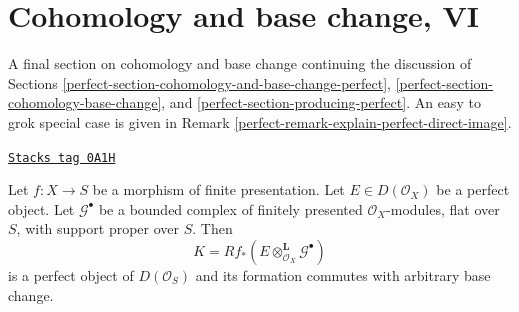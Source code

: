 \section{Cohomology and base change, VI}
\label{perfect-section-cohomology-and-base-change-final}
A final section on cohomology and base change continuing
the discussion of Sections
\ref{perfect-section-cohomology-and-base-change-perfect},
\ref{perfect-section-cohomology-base-change}, and
\ref{perfect-section-producing-perfect}.
An easy to grok special case is given in
Remark \ref{perfect-remark-explain-perfect-direct-image}.

\begin{lemma}
\label{perfect-lemma-base-change-tensor-perfect}
\href{https://stacks.math.columbia.edu/tag/0A1H}{\texttt{Stacks tag 0A1H}}

Let $f : X \to S$ be a morphism of finite presentation.
Let $E \in D(\mathcal{O}_X)$ be a perfect object. Let $\mathcal{G}^\bullet$
be a bounded complex of finitely presented $\mathcal{O}_X$-modules,
flat over $S$, with support proper over $S$. Then
$$
K = Rf_*(E \otimes_{\mathcal{O}_X}^\mathbf{L} \mathcal{G}^\bullet)
$$
is a perfect object of $D(\mathcal{O}_S)$ and its formation
commutes with arbitrary base change.
\end{lemma}

